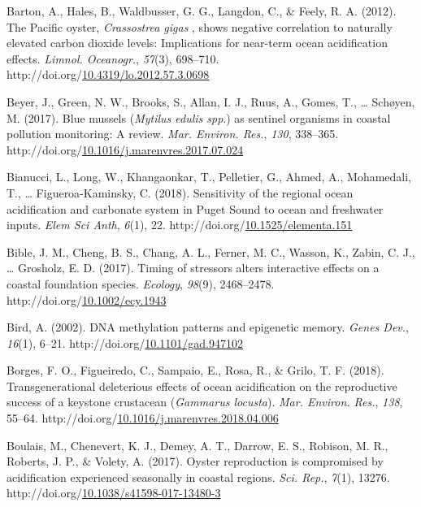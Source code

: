\documentclass [11pt, proquest] {uwthesis}[2015/03/03]
\newlength{\cslhangindent}
\newenvironment{CSLReferences}%
{\setlength{\parindent}{0pt}%
\everypar{\setlength{\hangindent}{\cslhangindent}}\ignorespaces}%
{\par}
\begin{document}
\begin{CSLReferences}{1}{0}
\leavevmode\hypertarget{ref-Barton2012}{}%
Barton, A., Hales, B., Waldbusser, G. G., Langdon, C., \& Feely, R. A. (2012). {The Pacific oyster, \emph{Crassostrea gigas} , shows negative correlation to naturally elevated carbon dioxide levels: Implications for near-term ocean acidification effects}. \emph{Limnol. Oceanogr.}, \emph{57}(3), 698--710. http://doi.org/\href{https://doi.org/10.4319/lo.2012.57.3.0698}{10.4319/lo.2012.57.3.0698}

\leavevmode\hypertarget{ref-Beyer2017}{}%
Beyer, J., Green, N. W., Brooks, S., Allan, I. J., Ruus, A., Gomes, T., \ldots{} Schøyen, M. (2017). {Blue mussels (\emph{Mytilus edulis spp}.) as sentinel organisms in coastal pollution monitoring: A review}. \emph{Mar. Environ. Res.}, \emph{130}, 338--365. http://doi.org/\href{https://doi.org/10.1016/j.marenvres.2017.07.024}{10.1016/j.marenvres.2017.07.024}

\leavevmode\hypertarget{ref-Bianucci2018}{}%
Bianucci, L., Long, W., Khangaonkar, T., Pelletier, G., Ahmed, A., Mohamedali, T., \ldots{} Figueroa-Kaminsky, C. (2018). {Sensitivity of the regional ocean acidification and carbonate system in Puget Sound to ocean and freshwater inputs}. \emph{Elem Sci Anth}, \emph{6}(1), 22. http://doi.org/\href{https://doi.org/10.1525/elementa.151}{10.1525/elementa.151}

\leavevmode\hypertarget{ref-Bible2017}{}%
Bible, J. M., Cheng, B. S., Chang, A. L., Ferner, M. C., Wasson, K., Zabin, C. J., \ldots{} Grosholz, E. D. (2017). {Timing of stressors alters interactive effects on a coastal foundation species}. \emph{Ecology}, \emph{98}(9), 2468--2478. http://doi.org/\href{https://doi.org/10.1002/ecy.1943}{10.1002/ecy.1943}

\leavevmode\hypertarget{ref-Bird2002}{}%
Bird, A. (2002). {DNA methylation patterns and epigenetic memory}. \emph{Genes Dev.}, \emph{16}(1), 6--21. http://doi.org/\href{https://doi.org/10.1101/gad.947102}{10.1101/gad.947102}

\leavevmode\hypertarget{ref-Borges2018}{}%
Borges, F. O., Figueiredo, C., Sampaio, E., Rosa, R., \& Grilo, T. F. (2018). {Transgenerational deleterious effects of ocean acidification on the reproductive success of a keystone crustacean (\emph{Gammarus locusta})}. \emph{Mar. Environ. Res.}, \emph{138}, 55--64. http://doi.org/\href{https://doi.org/10.1016/j.marenvres.2018.04.006}{10.1016/j.marenvres.2018.04.006}

\leavevmode\hypertarget{ref-Boulais2017}{}%
Boulais, M., Chenevert, K. J., Demey, A. T., Darrow, E. S., Robison, M. R., Roberts, J. P., \& Volety, A. (2017). {Oyster reproduction is compromised by acidification experienced seasonally in coastal regions}. \emph{Sci. Rep.}, \emph{7}(1), 13276. http://doi.org/\href{https://doi.org/10.1038/s41598-017-13480-3}{10.1038/s41598-017-13480-3}


\end{CSLReferences}
\end{document}
